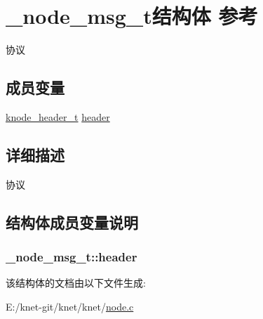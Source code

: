 \hypertarget{a00039}{}\section{\+\_\+node\+\_\+msg\+\_\+t结构体 参考}
\label{a00039}


协议  


\subsection*{成员变量}
\begin{DoxyCompactItemize}
\item 
\hyperlink{a00101_a8624d982efa4afd872ffe22695031845_a8624d982efa4afd872ffe22695031845}{knode\+\_\+header\+\_\+t} \hyperlink{a00039_a3f65ad5a1af0802f7c268693b881c2e4_a3f65ad5a1af0802f7c268693b881c2e4}{header}
\end{DoxyCompactItemize}


\subsection{详细描述}
协议 

\subsection{结构体成员变量说明}
\hypertarget{a00039_a3f65ad5a1af0802f7c268693b881c2e4_a3f65ad5a1af0802f7c268693b881c2e4}{}
\subsubsection[{header}]{ \+\_\+node\+\_\+msg\+\_\+t\+::header}\label{a00039_a3f65ad5a1af0802f7c268693b881c2e4_a3f65ad5a1af0802f7c268693b881c2e4}


该结构体的文档由以下文件生成\+:\begin{DoxyCompactItemize}
\item 
E\+:/knet-\/git/knet/knet/\hyperlink{a00101}{node.\+c}\end{DoxyCompactItemize}
